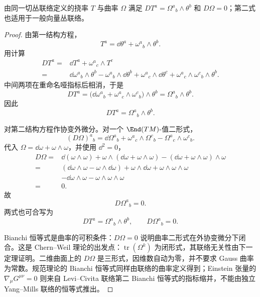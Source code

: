 \begin{theorem}
由同一切丛联络定义的挠率 $T$ 与曲率 $\Omega$ 满足 $DT^a=\Omega^a{}_b\wedge\theta^b$ 和 $D\Omega=0$；第二式也适用于一般向量丛联络。
\end{theorem}
\begin{proof}
由第一结构方程，
\[
T^a=\dd\theta^a+\omega^a{}_b\wedge\theta^b.
\]
用计算
\[
\begin{aligned}
D T^a
={}&\dd T^a+\omega^a{}_c\wedge T^c\\
={}&\dd\omega^a{}_b\wedge\theta^b
-\omega^a{}_b\wedge\dd\theta^b
+\omega^a{}_c\wedge\dd\theta^c
+\omega^a{}_c\wedge\omega^c{}_b\wedge\theta^b.
\end{aligned}
\]
中间两项在重命名哑指标后相消，于是
\[
D T^a
=\bigl(\dd\omega^a{}_b+\omega^a{}_c\wedge\omega^c{}_b\bigr)\wedge\theta^b
=\Omega^a{}_b\wedge\theta^b.
\]
因此
\begin{equation}\label{eq:math-dg-bianchi-first}
\boxed{D T^a=\Omega^a{}_b\wedge\theta^b.}
\end{equation}

对第二结构方程作协变外微分。对一个 $\End(TM)$-值二形式，
\[
(D\Omega)^a{}_b
=\dd\Omega^a{}_b
+\omega^a{}_c\wedge\Omega^c{}_b
-\Omega^a{}_c\wedge\omega^c{}_b.
\]
代入 $\Omega=\dd\omega+\omega\wedge\omega$，并使用 $\dd^2=0$，
\[
\begin{aligned}
D\Omega
={}&\dd(\omega\wedge\omega)
+\omega\wedge(\dd\omega+\omega\wedge\omega)
-(\dd\omega+\omega\wedge\omega)\wedge\omega\\
={}&(\dd\omega\wedge\omega-\omega\wedge\dd\omega)
+\omega\wedge\dd\omega+\omega\wedge\omega\wedge\omega\\
&-\dd\omega\wedge\omega-\omega\wedge\omega\wedge\omega\\
={}&0.
\end{aligned}
\]
故
\begin{equation}\label{eq:math-dg-bianchi-second}
\boxed{D\Omega^a{}_b=0.}
\end{equation}
两式也可合写为
\begin{equation}\label{eq:math-dg-synthesis-bianchi}
D T^a=\Omega^a{}_b\wedge\theta^b,
\qquad
D\Omega^a{}_b=0.
\end{equation}

Bianchi 恒等式是曲率的可积条件：$D\Omega=0$ 说明曲率二形式在外协变微分下闭合。这是 Chern--Weil 理论的出发点：$\operatorname{tr}(\Omega^k)$ 为闭形式，其联络无关性由下一定理证明。二维曲面上的 $D\Omega$ 是三形式，因维数自动为零，并不要求 Gauss 曲率为常数。规范理论的 Bianchi 恒等式同样由联络的曲率定义得到；Einstein 张量的 $\nabla_\mu G^{\mu\nu}=0$ 则来自 Levi--Civita 联络第二 Bianchi 恒等式的指标缩并，不能由独立 Yang--Mills 联络的恒等式推出。
\end{proof}


